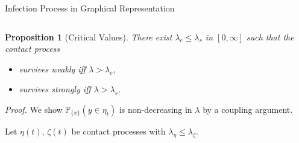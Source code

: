 \documentclass[envcountsect, aspectratio=149]{beamer}
\makeatletter
\newcommand*{\da@rightarrow}{\mathchar"0\hexnumber@\symAMSa 4B }
\newcommand*{\xdashrightarrow}[2][]{%
  \mathrel{%
    \mathpalette{\da@xarrow{#1}{#2}{}\da@rightarrow{\,}{}}{}%
  }%
}
\newcommand*{\da@xarrow}[7]{%
  \sbox0{$\ifx#7\scriptstyle\scriptscriptstyle\else\scriptstyle\fi#5#1#6\m@th$}%
  \sbox2{$\ifx#7\scriptstyle\scriptscriptstyle\else\scriptstyle\fi#5#2#6\m@th$}%
  \sbox4{$#7\dabar@\m@th$}%
  \dimen@=\wd0 %
  \ifdim\wd2 >\dimen@
    \dimen@=\wd2 %
  \fi
  \count@=2 %
  \def\da@bars{\dabar@\dabar@}%
  \@whiledim\count@\wd4<\dimen@\do{%
    \advance\count@\@ne
    \expandafter\def\expandafter\da@bars\expandafter{%
      \da@bars
      \dabar@ 
    }%
  }%
  \mathrel{#3}%
  \mathrel{%
    \mathop{\da@bars}\limits
    \ifx\\#1\\%
    \else
      _{\copy0}%
    \fi
    \ifx\\#2\\%
    \else
      ^{\copy2}%
    \fi
  }%
  \mathrel{#4}%
}
\newtheorem{proposition}[theorem]{Proposition}
\renewcommand{\P}{\mathbb{P}}
\renewcommand{\[}{
	\setlength\abovedisplayskip{0.5ex}
	\setlength{\belowdisplayskip}{0.5ex}
	\setlength{\abovedisplayshortskip}{0.5ex}
	\setlength{\belowdisplayshortskip}{0.5ex}\begin{equation*}}
\makeatother
\begin{document}
\begin{frame}{Infection Process in Graphical Representation}
\begin{columns}
\begin{column}{0.48\textwidth}
		\end{column}
		\end{columns}
	\end{frame}
	
	\begin{frame}
			\addtocounter{theorem}{-1}
			\begin{proposition}[Critical Values]
				There exist $\lambda_c \leq \lambda_s$ in $[0,\infty]$ such that the contact process
				\begin{itemize}[label=$\bullet$]
					\item survives weakly iff $\lambda > \lambda_c$,
					\item survives strongly iff $\lambda > \lambda_s$.
				\end{itemize}
			\end{proposition}
			\emph{Proof.}
			\pause
			We show $\P_{\{x\}}(y\in \eta_t)$ is non-decreasing in $\lambda$ by a coupling argument.
			
			\pause Let $\eta(t)$, $\zeta(t)$ be contact processes with $\lambda_{\eta} \leq \lambda_{\zeta}$.
			
			\begin{columns}
			\begin{column}{0.48\textwidth}
				\begin{enumerate}[label=\arabic*)]
					\onslide<6->{\item Put $\xdashrightarrow{}$ at rate $(\lambda_\zeta - \lambda_\eta)$.}
				\end{enumerate}
			\end{column}
			\begin{column}{0.48\textwidth}
\end{column}
\end{columns}
\end{frame}
\end{document}
